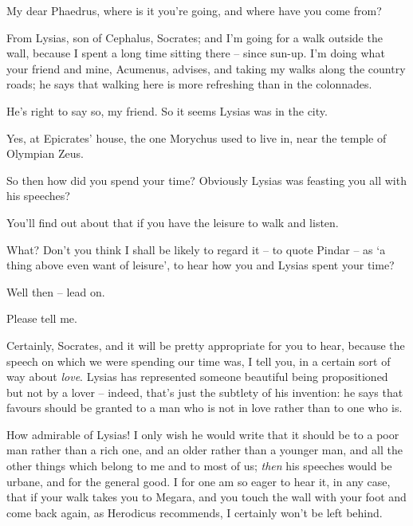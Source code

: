 
\page[right]

My dear Phaedrus, where is it you're going, and  
where have you come from?

From Lysias, son of
Cephalus, Socrates; and
I'm going for a walk outside the
wall, because I spent a
long time sitting there -- since sun-up. I'm doing what your friend and
 mine, Acumenus,
advises, and taking my walks along the country roads; he says that
walking here is more refreshing than in the colonnades. 

He's right to say so, my friend. So it seems Lysias was in the
city.

Yes, at Epicrates' house, the one Morychus used to live
in, near the temple of
Olympian Zeus. 

So then how did you spend your time? Obviously Lysias was
feasting you all with his
speeches?

You'll find out about that if you have the leisure to walk and
listen.

What? Don't you think I shall be likely to regard it -- to
quote Pindar -- as ‘a
thing above even want of leisure', to  hear how you and Lysias
spent your time?

Well then -- lead on. 

Please tell me.

Certainly, Socrates, and it will be pretty appropriate for you
to hear, because the speech on which we were spending our time was, I
tell you, in a certain sort of way about
{\em love}. 
Lysias has represented someone beautiful being propositioned but not by
a lover -- indeed, that's just the subtlety of his invention: he says
that favours should be
granted to a man who is
not in love rather than to one who is.

How admirable of Lysias! I only wish he would  write
that it should be to a poor man rather than a rich one, and an older
rather than a younger man, and all the other  things which
belong to me and to most of us; {\em then} his speeches would be urbane,
and for the general good.
I for one am so eager to hear it, in any case, that if your walk takes
you to Megara, and you touch the wall with your foot and come back
 again, as Herodicus
recommends, I certainly
won't be left behind.

